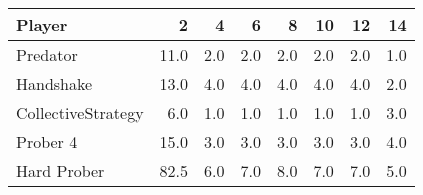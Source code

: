 \begin{tabular}{lrrrrrrr}
\toprule
             Player &     2 &    4 &    6 &    8 &   10 &   12 &   14 \\
\midrule
           Predator &  11.0 &  2.0 &  2.0 &  2.0 &  2.0 &  2.0 &  1.0 \\
          Handshake &  13.0 &  4.0 &  4.0 &  4.0 &  4.0 &  4.0 &  2.0 \\
 CollectiveStrategy &   6.0 &  1.0 &  1.0 &  1.0 &  1.0 &  1.0 &  3.0 \\
           Prober 4 &  15.0 &  3.0 &  3.0 &  3.0 &  3.0 &  3.0 &  4.0 \\
        Hard Prober &  82.5 &  6.0 &  7.0 &  8.0 &  7.0 &  7.0 &  5.0 \\
\bottomrule
\end{tabular}
